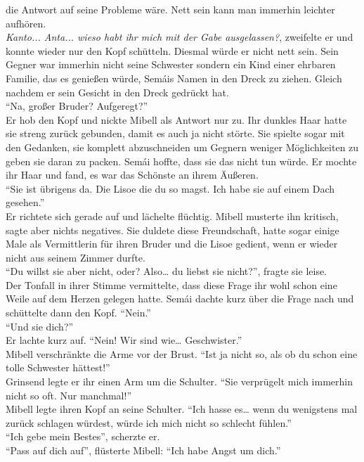 die Antwort auf seine Probleme wäre. Nett sein kann man immerhin leichter aufhören.\\
\textit{Kanto... Anta... wieso habt ihr mich mit der Gabe ausgelassen?}, zweifelte er 
und konnte wieder nur den Kopf schütteln. Diesmal würde er nicht nett sein. Sein Gegner war 
immerhin nicht seine Schwester sondern ein Kind einer ehrbaren Familie, das es genießen würde, 
Semáis Namen in den Dreck zu ziehen. Gleich nachdem er sein Gesicht in den Dreck gedrückt hat. \\
``Na, großer Bruder? Aufgeregt?''\\
Er hob den Kopf und nickte Mibell als Antwort nur zu. Ihr dunkles Haar hatte sie streng 
zurück gebunden, damit es auch ja nicht störte. Sie spielte sogar mit den Gedanken, sie komplett 
abzuschneiden um Gegnern weniger Möglichkeiten zu geben sie daran zu packen. Semái hoffte, dass sie 
das nicht tun würde. Er mochte ihr Haar und fand, es war das Schönste an ihrem Äußeren. \\
``Sie ist übrigens da. Die Lisoe die du so magst. Ich habe sie auf einem Dach gesehen.''\\
Er richtete sich gerade auf und lächelte flüchtig. Mibell musterte ihn kritisch, sagte aber nichts 
negatives. Sie duldete diese Freundschaft, hatte sogar einige Male als Vermittlerin für ihren 
Bruder 
und die Lisoe gedient, wenn er wieder nicht aus seinem Zimmer durfte.\\
``Du willst sie aber nicht, oder? Also… du liebst sie nicht?'', fragte sie leise.\\
Der Tonfall in ihrer Stimme vermittelte, dass diese Frage ihr wohl schon eine Weile auf dem Herzen 
gelegen hatte. Semái dachte kurz über die Frage nach und schüttelte dann den Kopf. ``Nein.''\\
``Und sie dich?''\\
Er lachte kurz auf. ``Nein! Wir sind wie… Geschwister.''\\
Mibell verschränkte die Arme vor der Brust. ``Ist ja nicht so, als ob du schon eine tolle Schwester 
hättest!''\\
Grinsend legte er ihr einen Arm um die Schulter. ``Sie verprügelt mich immerhin nicht so oft. Nur 
manchmal!''\\
Mibell legte ihren Kopf an seine Schulter. ``Ich hasse es… wenn du wenigstens mal zurück schlagen 
würdest, würde ich mich nicht so schlecht fühlen.''\\
``Ich gebe mein Bestes'', scherzte er. \\
``Pass auf dich auf'', flüsterte Mibell: ``Ich habe Angst um dich.''\\
